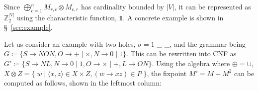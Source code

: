 \documentclass[sigplan,review,anonymous,acmsmall]{acmart}\settopmatter{printfolios=false,printccs=false,printacmref=false}
\begin{document}
  Since $\bigoplus_{c = 1}^n M_{r,c} \otimes M_{c,r}$ has cardinality bounded by $|V|$, it can be represented as $\mathbb{Z}_2^{|V|}$ using the characteristic function, $\mathds{1}$. A concrete example is shown in \S~\ref{sec:example}.

  Let us consider an example with two holes, $\sigma = 1$ \_ \_, and the grammar being $G\coloneqq\{S\rightarrow N O N, O \rightarrow + \mid \times, N \rightarrow 0 \mid 1\}$. This can be rewritten into CNF as $G'\coloneqq \{S \rightarrow N L, N \rightarrow 0 \mid 1, O \rightarrow × \mid +, L \rightarrow O N\}$. Using the algebra where $\oplus=\cup$, $X \otimes Z = \big\{\;w \mid \langle x, z\rangle \in X \times Z, (w\rightarrow xz) \in P\;\big\}$, the fixpoint $M' = M + M^2$ can be computed as follows, shown in the leftmost column:\\
\end{document}
